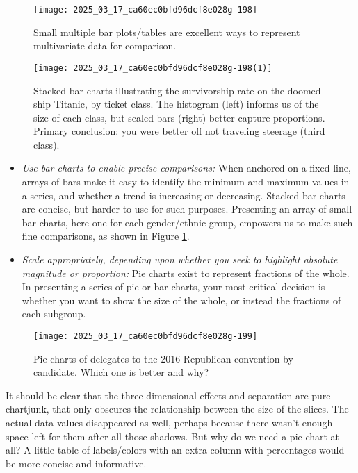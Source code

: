 \documentclass[10pt]{article}
\begin{document}
\begin{figure}[H]
    \centering
    \texttt{[image: 2025\_03\_17\_ca60ec0bfd96dcf8e028g-198]}
    \caption{Small multiple bar plots/tables are excellent ways to represent multivariate data for comparison.}
    \label{fig:multiple-bar-plots}
\end{figure}

\begin{figure}[H]
    \centering
    \texttt{[image: 2025\_03\_17\_ca60ec0bfd96dcf8e028g-198(1)]}
    \caption{Stacked bar charts illustrating the survivorship rate on the doomed ship Titanic, by ticket class. The histogram (left) informs us of the size of each class, but scaled bars (right) better capture proportions. Primary conclusion: you were better off not traveling steerage (third class).}
    \label{fig:stacked-bar-charts-titanic}
\end{figure}

\begin{itemize}
    \item \textit{Use bar charts to enable precise comparisons:} When anchored on a fixed line, arrays of bars make it easy to identify the minimum and maximum values in a series, and whether a trend is increasing or decreasing. Stacked bar charts are concise, but harder to use for such purposes. Presenting an array of small bar charts, here one for each gender/ethnic group, empowers us to make such fine comparisons, as shown in Figure \ref{fig:multiple-bar-plots}.
    \item \textit{Scale appropriately, depending upon whether you seek to highlight absolute magnitude or proportion:} Pie charts exist to represent fractions of the whole. In presenting a series of pie or bar charts, your most critical decision is whether you want to show the size of the whole, or instead the fractions of each subgroup.
\end{itemize}

\begin{figure}[H]
    \centering
    \texttt{[image: 2025\_03\_17\_ca60ec0bfd96dcf8e028g-199]}
    \caption{Pie charts of delegates to the 2016 Republican convention by candidate. Which one is better and why?}
    \label{fig:pie-charts-delegates}
\end{figure}

It should be clear that the three-dimensional effects and separation are pure chartjunk, that only obscures the relationship between the size of the slices. The actual data values disappeared as well, perhaps because there wasn't enough space left for them after all those shadows. But why do we need a pie chart at all? A little table of labels/colors with an extra column with percentages would be more concise and informative.
\end{document}
